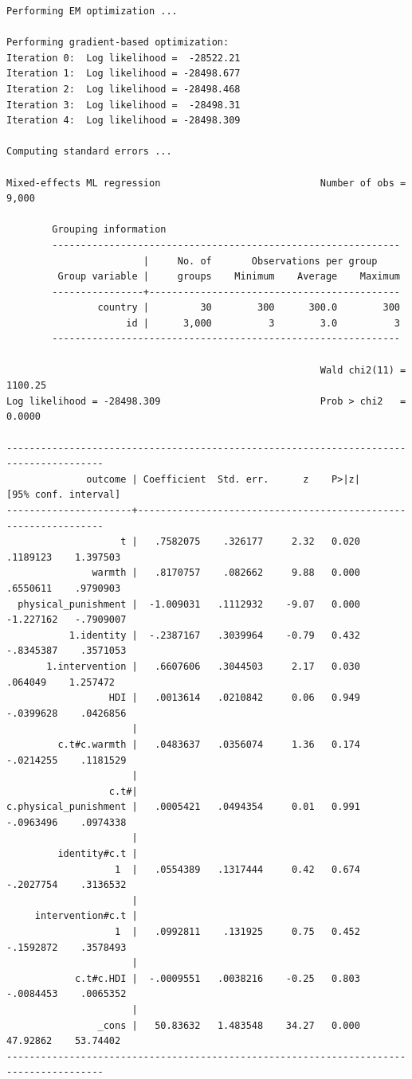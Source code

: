 \documentclass[
  letterpaper,
  DIV=11,
  numbers=noendperiod]{scrreprt}
\begin{document}
\begin{verbatim}
Performing EM optimization ...

Performing gradient-based optimization: 
Iteration 0:  Log likelihood =  -28522.21  
Iteration 1:  Log likelihood = -28498.677  
Iteration 2:  Log likelihood = -28498.468  
Iteration 3:  Log likelihood =  -28498.31  
Iteration 4:  Log likelihood = -28498.309  

Computing standard errors ...

Mixed-effects ML regression                            Number of obs =   9,000

        Grouping information
        -------------------------------------------------------------
                        |     No. of       Observations per group
         Group variable |     groups    Minimum    Average    Maximum
        ----------------+--------------------------------------------
                country |         30        300      300.0        300
                     id |      3,000          3        3.0          3
        -------------------------------------------------------------

                                                       Wald chi2(11) = 1100.25
Log likelihood = -28498.309                            Prob > chi2   =  0.0000

---------------------------------------------------------------------------------------
              outcome | Coefficient  Std. err.      z    P>|z|     [95% conf. interval]
----------------------+----------------------------------------------------------------
                    t |   .7582075    .326177     2.32   0.020     .1189123    1.397503
               warmth |   .8170757    .082662     9.88   0.000     .6550611    .9790903
  physical_punishment |  -1.009031   .1112932    -9.07   0.000    -1.227162   -.7909007
           1.identity |  -.2387167   .3039964    -0.79   0.432    -.8345387    .3571053
       1.intervention |   .6607606   .3044503     2.17   0.030      .064049    1.257472
                  HDI |   .0013614   .0210842     0.06   0.949    -.0399628    .0426856
                      |
         c.t#c.warmth |   .0483637   .0356074     1.36   0.174    -.0214255    .1181529
                      |
                  c.t#|
c.physical_punishment |   .0005421   .0494354     0.01   0.991    -.0963496    .0974338
                      |
         identity#c.t |
                   1  |   .0554389   .1317444     0.42   0.674    -.2027754    .3136532
                      |
     intervention#c.t |
                   1  |   .0992811    .131925     0.75   0.452    -.1592872    .3578493
                      |
            c.t#c.HDI |  -.0009551   .0038216    -0.25   0.803    -.0084453    .0065352
                      |
                _cons |   50.83632   1.483548    34.27   0.000     47.92862    53.74402
---------------------------------------------------------------------------------------


\end{verbatim}
\end{document}
